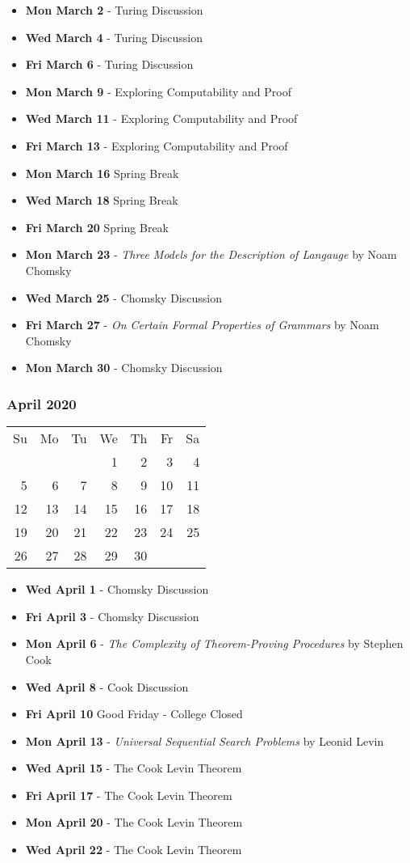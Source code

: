 \begin{itemize}
\item\textbf{Mon March  2} - Turing Discussion
\item\textbf{Wed March  4} - Turing Discussion
\item\textbf{Fri March  6} - Turing Discussion
\item\textbf{Mon March  9} - Exploring Computability and Proof
\item\textbf{Wed March 11} - Exploring Computability and Proof
\item\textbf{Fri March 13} - Exploring Computability and Proof
\item\textbf{Mon March 16} Spring Break
\item\textbf{Wed March 18} Spring Break
\item\textbf{Fri March 20} Spring Break
\item\textbf{Mon March 23} - {\em Three Models for the Description of
Langauge} by Noam Chomsky
\item\textbf{Wed March 25} - Chomsky Discussion
\item\textbf{Fri March 27} - {\em On Certain Formal Properties of Grammars}  by Noam Chomsky
\item\textbf{Mon March 30} - Chomsky Discussion
\end{itemize}
\hrulefill


\subsubsection*{April 2020}
\begin{tabular}{rrrrrrr}
Su & Mo & Tu & We & Th & Fr & Sa\\
   &    &    &  1 &  2 &  3 &  4\\
 5 &  6 &  7 &  8 &  9 & 10 & 11\\
12 & 13 & 14 & 15 & 16 & 17 & 18\\
19 & 20 & 21 & 22 & 23 & 24 & 25\\ 
26 & 27 & 28 & 29 & 30 &    &\\ 
\end{tabular}
\begin{itemize}
\item\textbf{Wed April  1} - Chomsky Discussion
\item\textbf{Fri April  3} - Chomsky Discussion
\item\textbf{Mon April  6} - {\em The Complexity of Theorem-Proving
Procedures} by Stephen Cook
\item\textbf{Wed April  8} - Cook Discussion
\item\textbf{Fri April 10} Good Friday - College Closed
\item\textbf{Mon April 13} - {\em Universal Sequential Search Problems
} by Leonid Levin
\item\textbf{Wed April 15} - The Cook Levin Theorem
\item\textbf{Fri April 17} - The Cook Levin Theorem
\item\textbf{Mon April 20} - The Cook Levin Theorem
\item\textbf{Wed April 22} - The Cook Levin Theorem
\end{itemize}
\hrulefill
